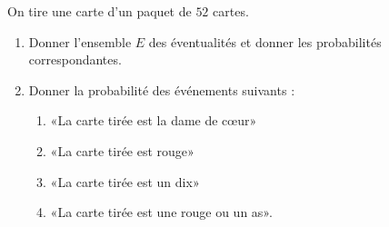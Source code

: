 
\begin{exercice}\label{exosmath-0187}

    On tire une carte d'un paquet de \( 52\) cartes.
    \begin{enumerate}
        \item
            Donner l'ensemble \( E\) des éventualités et donner les probabilités correspondantes.
        \item
            Donner la probabilité des événements suivants :
            \begin{enumerate}
                \item
                    «La carte tirée est la dame de cœur» 
                \item
                    «La carte tirée est rouge» 
                \item
                    «La carte tirée est un dix» 
                \item
                    «La carte tirée est une rouge ou un as».
            \end{enumerate}
    \end{enumerate}

\end{exercice}
